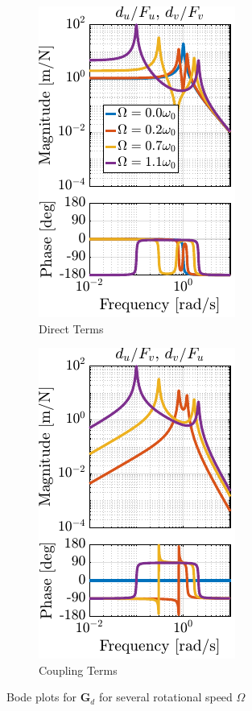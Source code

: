\documentclass[10pt]{iopart}
\begin{document}
\begin{figure}[htbp]
\begin{subfigure}[c]{0.48\linewidth}
\centering
\includegraphics[scale=1]{figs/fig03a.pdf}
\caption{\label{fig:plant_compare_rotating_speed_direct} Direct Terms}
\end{subfigure}
\hfill
\begin{subfigure}[c]{0.48\linewidth}
\centering
\includegraphics[scale=1]{figs/fig03b.pdf}
\caption{\label{fig:plant_compare_rotating_speed_coupling} Coupling Terms}
\end{subfigure}
\hfill
\caption{\label{fig:plant_compare_rotating_speed}Bode plots for \(\mathbf{G}_d\) for several rotational speed \(\Omega\)}
\centering
\end{figure}
\end{document}
